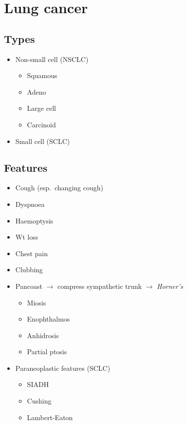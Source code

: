\documentclass[
  14pt,
]{memoir}
\providecommand{\tightlist}{%
  \setlength{\itemsep}{0pt}\setlength{\parskip}{0pt}}
\begin{document}
\hypertarget{lung-cancer}{%
\chapter{Lung cancer}\label{lung-cancer}}

\hypertarget{types-1}{%
\section{Types}\label{types-1}}

\begin{itemize}
\tightlist
\item
  Non-small cell (NSCLC)

  \begin{itemize}
  \tightlist
  \item
    Squamous
  \item
    Adeno
  \item
    Large cell
  \item
    Carcinoid
  \end{itemize}
\item
  Small cell (SCLC)
\end{itemize}

\hypertarget{features-1}{%
\section{Features}\label{features-1}}

\begin{itemize}
\tightlist
\item
  Cough (esp.~changing cough)
\item
  Dyspnoea
\item
  Haemoptysis
\item
  Wt loss
\item
  Chest pain
\item
  Clubbing
\item
  Pancoast \(\rightarrow\) compress sympathetic trunk \(\rightarrow\)
  \emph{Horner's}

  \begin{itemize}
  \tightlist
  \item
    Miosis
  \item
    Enophthalmos
  \item
    Anhidrosis
  \item
    Partial ptosis
  \end{itemize}
\item
  Paraneoplastic features (SCLC)

  \begin{itemize}
  \tightlist
  \item
    SIADH
  \item
    Cushing
  \item
    Lambert-Eaton
  \end{itemize}
\end{itemize}
\end{document}
